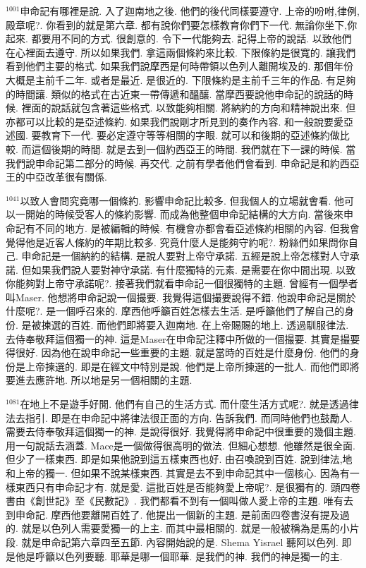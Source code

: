 \documentclass{book}
\begin{document}
$^{1001}$申命記有哪裡是說.
入了迦南地之後.
他們的後代同樣要遵守.
上帝的吩咐,律例,殿章呢?.
你看到的就是第六章.
都有說你們要怎樣教育你們下一代.
無論你坐下,你起來.
都要用不同的方式.
很創意的.
令下一代能夠去.
記得上帝的說話.
以致他們在心裡面去遵守.
所以如果我們.
拿這兩個條約來比較.
下限條約是很寬的.
讓我們看到他們主要的格式.
如果我們說摩西是何時帶領以色列人離開埃及的.
那個年份大概是主前千二年.
或者是最近.
是很近的.
下限條約是主前千三年的作品.
有足夠的時間讓.
類似的格式在古近東一帶傳遞和醞釀.
當摩西要說他申命記的說話的時候.
裡面的說話就包含著這些格式.
以致能夠相關.
將納約的方向和精神說出來.
但亦都可以比較的是亞述條約.
如果我們說剛才所見到的奏作內容.
和一般說要愛亞述國.
要教育下一代.
要必定遵守等等相關的字眼.
就可以和後期的亞述條約做比較.
而這個後期的時間.
就是去到一個約西亞王的時間.
我們就在下一課的時候.
當我們說申命記第二部分的時候.
再交代.
之前有學者他們會看到.
申命記是和約西亞王的中亞改革很有關係.

$^{1041}$以致人會問究竟哪一個條約.
影響申命記比較多.
但我個人的立場就會看.
他可以一開始的時候受客人的條約影響.
而成為他整個申命記結構的大方向.
當後來申命記有不同的地方.
是被編輯的時候.
有機會亦都會看亞述條約相關的內容.
但我會覺得他是近客人條約的年期比較多.
究竟什麼人是能夠守約呢?.
粉絲們如果問你自己.
申命記是一個納約的結構.
是說人要對上帝守承諾.
五經是說上帝怎樣對人守承諾.
但如果我們說人要對神守承諾.
有什麼獨特的元素.
是需要在你中間出現.
以致你能夠對上帝守承諾呢?.
接著我們就看申命記一個很獨特的主題.
曾經有一個學者叫Maser.
他想將申命記說一個撮要.
我覺得這個撮要說得不錯.
他說申命記是關於什麼呢?.
是一個呼召來的.
摩西他呼籲百姓怎樣去生活.
是呼籲他們了解自己的身份.
是被揀選的百姓.
而他們即將要入迦南地.
在上帝賜賜的地上.
透過馴服律法.
去侍奉敬拜這個獨一的神.
這是Maser在申命記注釋中所做的一個撮要.
其實是撮要得很好.
因為他在說申命記一些重要的主題.
就是當時的百姓是什麼身份.
他們的身份是上帝揀選的.
即是在經文中特別是說.
他們是上帝所揀選的一批人.
而他們即將要進去應許地.
所以地是另一個相關的主題.

$^{1081}$在地上不是遊手好閒.
他們有自己的生活方式.
而什麼生活方式呢?.
就是透過律法去指引.
即是在申命記中將律法很正面的方向.
告訴我們.
而同時他們也鼓勵人.
需要去侍奉敬拜這個獨一的神.
是說得很好.
我覺得將申命記中很重要的幾個主題.
用一句說話去涵蓋.
Mace是一個做得很高明的做法.
但細心想想.
他雖然是很全面.
但少了一樣東西.
即是如果他說到這五樣東西也好.
由召喚說到百姓.
說到律法,地和上帝的獨一.
但如果不說某樣東西.
其實是去不到申命記其中一個核心.
因為有一樣東西只有申命記才有.
就是愛.
這批百姓是否能夠愛上帝呢?.
是很獨有的.
頭四卷書由《創世記》至《民數記》.
我們都看不到有一個叫做人愛上帝的主題.
唯有去到申命記.
摩西他要離開百姓了.
他提出一個新的主題.
是前面四卷書沒有提及過的.
就是以色列人需要愛獨一的上主.
而其中最相關的.
就是一般被稱為是馬的小片段.
就是申命記第六章四至五節.
內容開始說的是.
Shema Yisrael 聽阿以色列.
即是他是呼籲以色列要聽.
耶華是哪一個耶華.
是我們的神.
我們的神是獨一的主.
\end{document}
